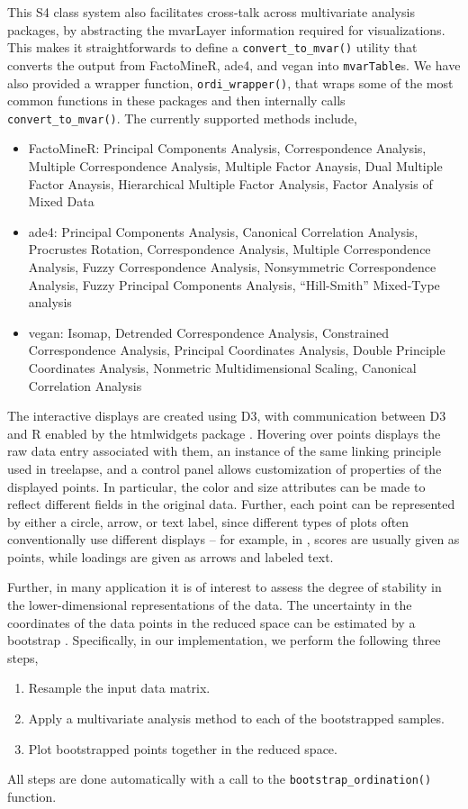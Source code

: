 This S4 class system also facilitates cross-talk across multivariate analysis
packages, by abstracting the mvarLayer information required for visualizations.
This makes it straightforwards to define a \texttt{convert\_to\_mvar()} utility
that converts the output from FactoMineR, ade4, and vegan into
\texttt{mvarTable}s. We have also provided a wrapper function,
\texttt{ordi\_wrapper()}, that wraps some of the most common functions in these
packages and then internally calls \texttt{convert\_to\_mvar()}. The currently
supported methods include,
\begin{itemize}
\item FactoMineR: Principal Components Analysis, Correspondence Analysis,
  Multiple Correspondence Analysis, Multiple Factor Anaysis, Dual Multiple
  Factor Anaysis, Hierarchical Multiple Factor Analysis, Factor Analysis of
  Mixed Data
\item ade4: Principal Components Analysis, Canonical Correlation Analysis,
  Procrustes Rotation, Correspondence Analysis, Multiple Correspondence
  Analysis, Fuzzy Correspondence Analysis, Nonsymmetric Correspondence Analysis,
  Fuzzy Principal Components Analysis, ``Hill-Smith'' Mixed-Type analysis
  \citep{hill1976principal}
\item vegan: Isomap, Detrended Correspondence Analysis, Constrained
  Correspondence Analysis, Principal Coordinates Analysis, Double Principle
  Coordinates Analysis, Nonmetric Multidimensional Scaling, Canonical
  Correlation Analysis
\end{itemize}

The interactive displays are created using D3, with communication between D3 and
R enabled by the htmlwidgets package \citep{vaidyanathan2014htmlwidgets}.
Hovering over points displays the raw data entry associated with them, an
instance of the same linking principle used in treelapse, and a control panel
allows customization of properties of the displayed points. In particular, the
color and size attributes can be made to reflect different fields in the
original data. Further, each point can be represented by either a circle, arrow,
or text label, since different types of plots often conventionally use different
displays -- for example, in \citep{dray2007ade4}, scores are usually given as
points, while loadings are given as arrows and labeled text.

Further, in many application it is of interest to assess the degree of stability
in the lower-dimensional representations of the data. The uncertainty in the
coordinates of the data points in the reduced space can be estimated by a
bootstrap \citep{daudin1988stability, chakerian2012computational}. Specifically,
in our implementation, we perform the following three steps,
\begin{enumerate}
\item Resample the input data matrix.
\item Apply a multivariate analysis method to each of the bootstrapped samples.
\item Plot bootstrapped points together in the reduced space.
\end{enumerate}
All steps are done automatically with a call to the
\texttt{bootstrap\_ordination()} function.

